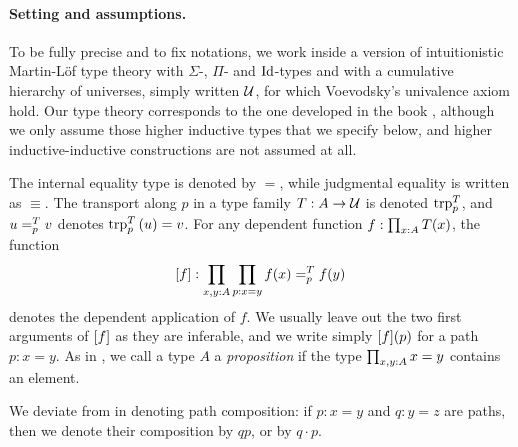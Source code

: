 \documentclass[english,a4paper]{lmcs}
\begin{document}
\paragraph{Setting and assumptions.}
To be fully precise and to fix notations, we work inside a version of
intuitionistic Martin-L\"of type theory with $\Sigma$-, $\Pi$- and
$\Id$-types and with a cumulative hierarchy of universes,
simply written $\UU$, for which Voevodsky's univalence axiom hold. 
Our type theory corresponds to the one developed in the book \cite{HoTT}, although we only assume those higher inductive types that we specify below, and higher inductive-inductive constructions are not assumed at all.

The internal equality type is denoted by $=$, while judgmental equality is written as $\equiv$.
The
transport along $p$ in a type family $T:A\to \UU$ is denoted
$\trp [T] p$, and $\pathover u T p v$ denotes $\trp [T] p {(u)} = v$.
For any dependent function $f\from\prod_{x\from A}T(x)$,
the function
\begin{displaymath}
  \ap f:\prod_{x,y\from A}\prod_{p\from x=y} \pathover {f(x)} T p
  {f(y)}
\end{displaymath}
denotes the dependent application of $f$. We usually leave out the two
first arguments of $\ap f$ as they are inferable, and we write simply
$\ap f (p)$ for a path $p:x=y$. As in \cite{HoTT}, we call a type $A$
a \emph{proposition} if the type $\prod_{x,y\from A} x=y$ contains an
element.

We deviate from \cite{HoTT} in denoting path composition:
if $p:x=y$ and $q:y=z$ are paths, then we denote their
composition by $qp$, or by $q\cdot p$.
\end{document}
